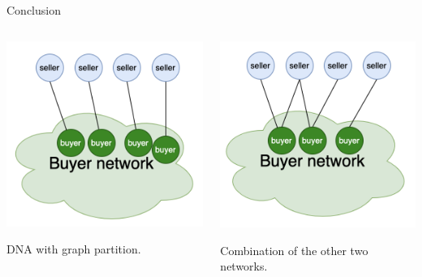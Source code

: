 \documentclass{beamer}
\begin{document}
\begin{frame}{Conclusion}
\begin{columns}
\begin{column}{0.3\textwidth}
\begin{center}
				\includegraphics[width=\textwidth]{NetworkStructure3}
			\end{center}
			DNA with graph partition.
		\end{column}
		\begin{column}{0.3\textwidth}
			\begin{center}
				\includegraphics[width=\textwidth]{NetworkStructure2}
			\end{center}
			Combination of the other two networks.
		\end{column}
	\end{columns}
\end{frame}
\end{document}
